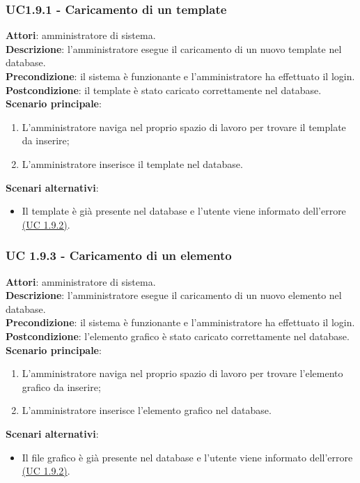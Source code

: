 \subsubsection{UC1.9.1 - Caricamento di un template}{
	\label{uc1.9.1}
	\textbf{Attori}: amministratore di sistema. \\
	\textbf{Descrizione}: l'amministratore esegue il caricamento di un nuovo template nel database. \\
	\textbf{Precondizione}: il sistema  è funzionante e l'amministratore ha effettuato il login.	\\
	\textbf{Postcondizione}: il template è stato caricato correttamente nel database.	\\
	\textbf{Scenario principale}:
	\begin{enumerate}
		\item L'amministratore naviga nel proprio spazio di lavoro  per trovare il template da inserire;
		\item L'amministratore inserisce il template nel database.
	\end{enumerate}
	\textbf{Scenari alternativi}:
	\begin{itemize}
		\item Il template è già presente nel database e l'utente viene informato dell'errore \hyperref[uc1.9.2]{(UC 1.9.2)}.
	\end{itemize}
	}
\subsubsection{UC 1.9.3 - Caricamento di un elemento}{
	\label{uc1.9.3}
	\textbf{Attori}: amministratore di sistema. \\
	\textbf{Descrizione}: l'amministratore esegue il caricamento di un nuovo elemento nel database. \\
	\textbf{Precondizione}: il sistema  è funzionante e l'amministratore ha effettuato il login.	\\
	\textbf{Postcondizione}: l'elemento grafico è stato caricato correttamente nel database.	\\
	\textbf{Scenario principale}:
	\begin{enumerate}
		\item L'amministratore naviga nel proprio spazio di lavoro per trovare l'elemento grafico da inserire;
		\item L'amministratore inserisce l'elemento grafico nel database.
	\end{enumerate}
	\textbf{Scenari alternativi}:
	\begin{itemize}
		\item Il file grafico è già presente nel database e l'utente viene informato dell'errore \hyperref[uc1.9.2]{(UC 1.9.2)}.
	\end{itemize}
	}

